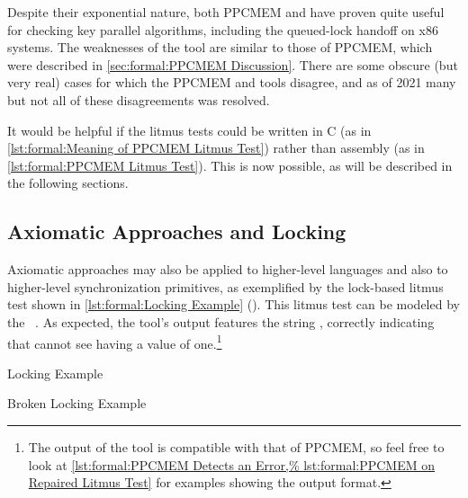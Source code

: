 Despite their exponential nature, both PPCMEM and  have proven quite
useful for checking key parallel algorithms, including the queued-lock
handoff on x86 systems.
The weaknesses of the  tool are similar to those of PPCMEM, which
were described in
\cref{sec:formal:PPCMEM Discussion}.
There are some obscure (but very real) cases for which the PPCMEM and
 tools disagree, and as of 2021 many but not all of these disagreements
was resolved.

It would be helpful if the litmus tests could be written in C
(as in \cref{lst:formal:Meaning of PPCMEM Litmus Test})
rather than assembly
(as in \cref{lst:formal:PPCMEM Litmus Test}).
This is now possible, as will be described in the following sections.

\subsection{Axiomatic Approaches and Locking}
\label{sec:formal:Axiomatic Approaches and Locking}

Axiomatic approaches may also be applied to higher-level
languages and also to higher-level synchronization primitives, as
exemplified by the lock-based litmus test shown in
\cref{lst:formal:Locking Example} ().
This litmus test can be modeled by
the ~\cite{Alglave:2018:FSC:3173162.3177156,LucMaranget2018lock.cat}.
As expected, the  tool's output features the string ,
correctly indicating that  cannot see  having a value
of one.\footnote{
	The output of the  tool is compatible with that
	of PPCMEM, so feel free to look at
	\cref{lst:formal:PPCMEM Detects an Error,%
	lst:formal:PPCMEM on Repaired Litmus Test}
	for examples showing the output format.}

\begin{listing}

\caption{Locking Example}
\label{lst:formal:Locking Example}
\end{listing}

\QuickQuizEnd

\begin{listing}

\caption{Broken Locking Example}
\label{lst:formal:Broken Locking Example}
\end{listing}

